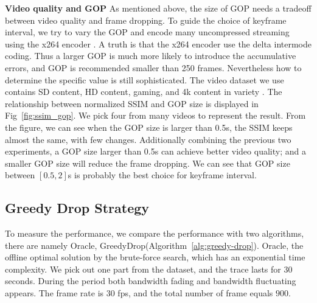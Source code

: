 \textbf{Video quality and GOP} As mentioned above, the size of GOP needs a tradeoff between video quality and frame dropping. To guide the choice of keyframe interval, we try to vary the GOP and encode many uncompressed streaming using the x264 encoder \cite{x264}. A truth is that the x264 encoder use the delta intermode coding. Thus a larger GOP is much more likely to introduce the accumulative errors, and GOP is recommended smaller than 250 frames. Nevertheless how to determine the specific value is still sophisticated. The video dataset we use contains SD content, HD content, gaming, and 4k content in variety \cite{video_dataset}. The relationship between normalized SSIM and GOP size is displayed in Fig~\ref{fig:ssim_gop}.
We pick four from many videos to represent the result. From the figure, we can see when the GOP size is larger than 0.5s, the SSIM keeps almost the same, with few changes. Additionally combining the previous two experiments, a GOP size larger than 0.5s can achieve better video quality; and a smaller GOP size will reduce the frame dropping. We can see that GOP size between $[0.5,2]$s is probably the best choice for keyframe interval.

\iffalse

\textbf{Varying bitrate.}
To make the conclusion more visible, we fix keyframe interval to be 8s and introduce network interruption between 19s and 21s. In different experiments, we provide sufficient network bandwidth and vary the bitrate to be 1000kbps, 1500kbps, 2000kbps, and 2500kbps. The frame drop is shown in Table~\ref{tab:bitrate}. The different bitrates do not make much difference, the number of drop in all cases is about 149.

\textbf{Summary.} We summarize and get conclusions. First, reducing keyframe interval leads to less frame drop. Second, bitrate does not influence frame drop for the short-term case, but the quality of each picture. Preliminary Evaluation points out that a small GOP is one useful try.
\fi

\vspace{-0.05in}  
\subsection{Greedy Drop Strategy}
To measure the performance, we compare the performance with two algorithms, there are namely Oracle, GreedyDrop(Algorithm~\ref{alg:greedy-drop}). Oracle, the offline optimal solution by the brute-force search, which has an exponential time complexity. We pick out one part from the dataset, and the trace lasts for $30$ seconds. During the period both bandwidth fading and bandwidth fluctuating appears. The frame rate is $30$ fps, and the total number of frame equals $900$.

